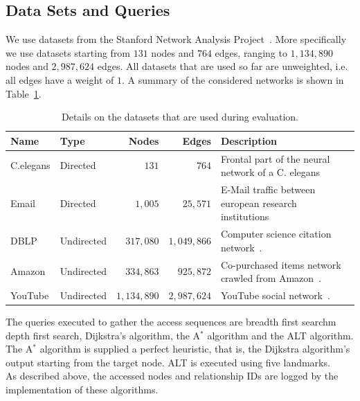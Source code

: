     \subsection*{Data Sets and Queries}
        We use datasets from the Stanford Network Analysis Project~\autocite{snap}.
        More specifically we use datasets starting from $131$ nodes and $764$ edges, ranging to $1,134,890$ nodes and $2,987,624$ edges.
        All datasets that are used so far are unweighted, i.e. all edges have a weight of $1$.
        A summary of the considered networks is shown in Table~\ref{datasets}.
        \begin{table}
        \begin{center}
            \begin{tabular}[c]{l l r r p{5.8cm}} \toprule
                Name & Type & Nodes & Edges & Description \\ \midrule
                 C.elegans & Directed & $131$ & $764$ & Frontal part of the neural network of a C. elegans~\autocite{celegans} \\ [0.8cm]
                 Email & Directed & $1,005$ & $25,571$ & E-Mail traffic between european research institutions~\autocite{email} \\ [0.8cm]
                 DBLP & Undirected & $317,080$ & $1,049,866$ & Computer science citation network~\autocite{lj}. \\ [0.8cm]
                 Amazon & Undirected & $334,863$ & $925,872$ & Co-purchased items network crawled from Amazon~\autocite{lj}. \\ [0.8cm]
                 YouTube & Undirected & $1,134,890$ & $2,987,624$ & YouTube social network~\autocite{mislove}. \\ \bottomrule
            \end{tabular}
            \end{center}
            \caption{Details on the datasets that are used during evaluation.}
            \label{datasets}
        \end{table}
        The queries executed to gather the access sequences are breadth first searchm depth first search, Dijkstra's algorithm, the A$^*$ algorithm and the ALT algorithm. 
        The A$^*$ algorithm is supplied a perfect heuristic, that is, the Dijkstra algorithm's output starting from the target node. ALT is executed using five landmarks. \\
        As described above, the accessed nodes and relationship IDs are logged by the implementation of these algorithms.

